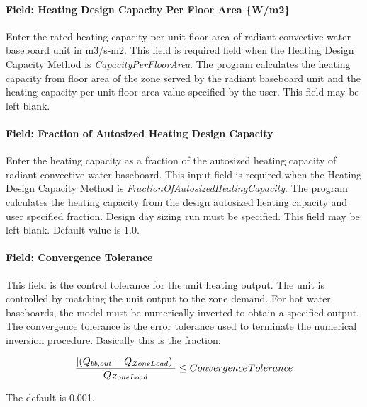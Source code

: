 \paragraph{Field: Heating Design Capacity Per Floor Area \{W/m2\}}\label{field-heating-design-capacity-per-floor-area-wm2-000}

Enter the rated heating capacity per unit floor area of radiant-convective water baseboard unit in m3/s-m2. This field is required field when the Heating Design Capacity Method is \emph{CapacityPerFloorArea}. The program calculates the heating capacity from floor area of the zone served by the radiant baseboard unit and the heating capacity per unit floor area value specified by the user. This field may be left blank.

\paragraph{Field: Fraction of Autosized Heating Design Capacity}\label{field-fraction-of-autosized-heating-design-capacity-000}

Enter the heating capacity as a fraction of the autosized heating capacity of radiant-convective water baseboard. This input field is required when the Heating Design Capacity Method is \emph{FractionOfAutosizedHeatingCapacity}. The program calculates the heating capacity from the design autosized heating capacity and user specified fraction. Design day sizing run must be specified. This field may be left blank. Default value is 1.0.

\paragraph{Field: Convergence Tolerance}\label{field-convergence-tolerance-000}

This field is the control tolerance for the unit heating output. The unit is controlled by matching the unit output to the zone demand. For hot water baseboards, the model must be numerically inverted to obtain a specified output. The convergence tolerance is the error tolerance used to terminate the numerical inversion procedure. Basically this is the fraction:

\begin{equation}
\frac{{\left| {({Q_{bb,out}} - {Q_{ZoneLoad}})} \right|}}{{{Q_{ZoneLoad}}}} \le Convergence{\kern 1pt} Tolerance
\end{equation}

The default is 0.001.

